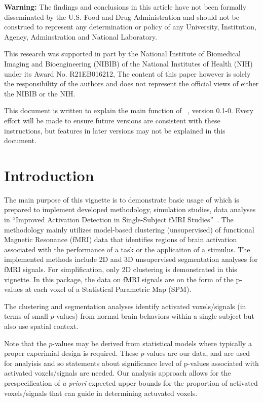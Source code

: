 
{\color{red} \bf Warning:}
The findings and conclusions in this article have not been
formally disseminated by the U.S. Food and Drug Administration
and should not be construed to represent any determination or
policy of any University, Institution, Agency, Adminstration
and National Laboratory.

This research was supported in part by the National Institute of
Biomedical Imaging and Bioengineering (NIBIB) of the National
Institutes of Health (NIH) under its Award No. R21EB016212,
The content of this paper however is solely the responsibility of the 
authors and does not represent the official views of either the
NIBIB or the NIH.

This document is written to explain the main
function of ~\citep{Chen2018}, version 0.1-0.
Every effort will be made to ensure future versions are consistent with
these instructions, but features in later versions may not be explained
in this document.



\section[Introduction]{Introduction}
\label{sec:introduction}

The main purpose of this vignette is to demonstrate basic usage of
 which is prepared to implement  developed methodology,
simulation studies, data analyses in
``Improved Activation Detection in Single-Subject fMRI
Studies''~\citep{ChenMaitra2018}.
The methodology mainly utilizes model-based clustering (unsupervised)
of functional Magnetic Resonance (fMRI) data that identifies regions
of brain activation associated with the performance of a task or the
applicaiton of a stimulus. The implemented methods include
2D and 3D unsupervised segmentation analyses for fMRI signals. 
For simplification, only 2D clustering is demonstrated in this vignette.
In this package, the data on fMRI signals are on the form of the
p-values at each voxel of a Statistical Parametric Map (SPM).

The clustering and segmentation analyses identify activated
voxels/signals (in terms of small $p$-values) from normal brain
behaviors within a single subject but also use spatial context. 

Note that the $p$-values may be derived from statistical models where
typically a proper experimial design is required.
These $p$-values are our data, and are used for 
analyisis and so statements about significance level of p-values
associated with activated voxels/signals are needed. Our analysis
approach allows for the prespecification of {\em a priori} expected
upper bounds for the proportion of activated voxels/signals that can
guide in determining actuvated voxels. 


